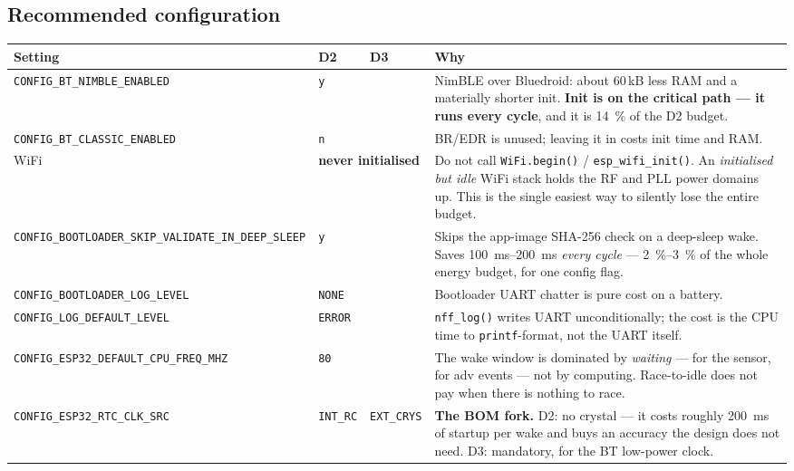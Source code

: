 \documentclass[11pt,a4paper]{article}
\begin{document}
\subsection{Recommended configuration}

\begin{center}
\begin{tabularx}{\textwidth}{lllX}
\toprule
\textbf{Setting} & \textbf{D2} & \textbf{D3} & \textbf{Why} \\
\midrule
\texttt{CONFIG\_BT\_NIMBLE\_ENABLED} & \multicolumn{2}{l}{\texttt{y}} & NimBLE over Bluedroid: about 60\,kB less RAM and a materially shorter init. \textbf{Init is on the critical path --- it runs every cycle}, and it is \SI{14}{\percent} of the D2 budget. \\
\texttt{CONFIG\_BT\_CLASSIC\_ENABLED} & \multicolumn{2}{l}{\texttt{n}} & BR/EDR is unused; leaving it in costs init time and RAM. \\
WiFi & \multicolumn{2}{l}{\textbf{never initialised}} & Do not call \texttt{WiFi.begin()} / \texttt{esp\_wifi\_init()}. An \emph{initialised but idle} WiFi stack holds the RF and PLL power domains up. This is the single easiest way to silently lose the entire budget. \\
\texttt{CONFIG\_BOOTLOADER\_SKIP\_VALIDATE\_IN\_DEEP\_SLEEP} & \multicolumn{2}{l}{\texttt{y}} & Skips the app-image SHA-256 check on a deep-sleep wake. Saves \SIrange{100}{200}{\milli\second} \emph{every cycle} --- \SIrange{2}{3}{\percent} of the whole energy budget, for one config flag. \\
\texttt{CONFIG\_BOOTLOADER\_LOG\_LEVEL} & \multicolumn{2}{l}{\texttt{NONE}} & Bootloader UART chatter is pure cost on a battery. \\
\texttt{CONFIG\_LOG\_DEFAULT\_LEVEL} & \multicolumn{2}{l}{\texttt{ERROR}} & \texttt{nff\_log()} writes UART unconditionally; the cost is the CPU time to \texttt{printf}-format, not the UART itself. \\
\texttt{CONFIG\_ESP32\_DEFAULT\_CPU\_FREQ\_MHZ} & \multicolumn{2}{l}{\texttt{80}} & The wake window is dominated by \emph{waiting} --- for the sensor, for adv events --- not by computing. Race-to-idle does not pay when there is nothing to race. \\
\texttt{CONFIG\_ESP32\_RTC\_CLK\_SRC} & \texttt{INT\_RC} & \texttt{EXT\_CRYS} & \textbf{The BOM fork.} D2: no crystal --- it costs roughly \SI{200}{\milli\second} of startup per wake and buys an accuracy the design does not need. D3: mandatory, for the BT low-power clock. \\

\end{tabularx}
\end{center}
\end{document}

